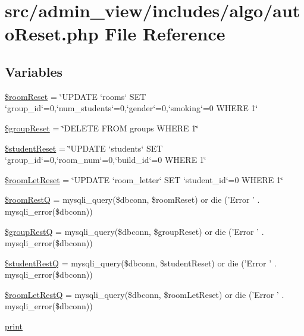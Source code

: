\hypertarget{autoReset_8php}{\section{src/admin\-\_\-view/includes/algo/auto\-Reset.php \-File \-Reference}
\label{autoReset_8php}
}
\subsection*{\-Variables}
\begin{DoxyCompactItemize}
\item 
\hyperlink{autoReset_8php_aacb611dbf5c84e030f2c54eff45ca222}{\$room\-Reset} = \char`\"{}\-U\-P\-D\-A\-T\-E `rooms` \-S\-E\-T `group\-\_\-id`=0,`num\-\_\-students`=0,`gender`=0,`smoking`=0 \-W\-H\-E\-R\-E 1\char`\"{}
\item 
\hyperlink{autoReset_8php_a196911b75d870334239968cfe0faccea}{\$group\-Reset} = \char`\"{}\-D\-E\-L\-E\-T\-E \-F\-R\-O\-M groups \-W\-H\-E\-R\-E 1\char`\"{}
\item 
\hyperlink{autoReset_8php_a9b9cdc0f04cb545881acb36c15d42c5e}{\$student\-Reset} = \char`\"{}\-U\-P\-D\-A\-T\-E `students` \-S\-E\-T `group\-\_\-id`=0,`room\-\_\-num`=0,`build\-\_\-id`=0 \-W\-H\-E\-R\-E 1\char`\"{}
\item 
\hyperlink{autoReset_8php_abdc52362179d3c8ff144e8da3468d399}{\$room\-Let\-Reset} = \char`\"{}\-U\-P\-D\-A\-T\-E `room\-\_\-letter` \-S\-E\-T `student\-\_\-id`=0 \-W\-H\-E\-R\-E 1\char`\"{}
\item 
\hyperlink{autoReset_8php_a5ee9920a3f7aaf091b8092eefdb65239}{\$room\-Rest\-Q} = mysqli\-\_\-query(\$dbconn, \$room\-Reset) or die ('\-Error ' . mysqli\-\_\-error(\$dbconn))
\item 
\hyperlink{autoReset_8php_a569059e4fb7abd35a8b0573e74b8c8cf}{\$group\-Rest\-Q} = mysqli\-\_\-query(\$dbconn, \$group\-Reset) or die ('\-Error ' . mysqli\-\_\-error(\$dbconn))
\item 
\hyperlink{autoReset_8php_ad531504cb204dbfaa4c9f041dba740e6}{\$student\-Rest\-Q} = mysqli\-\_\-query(\$dbconn, \$student\-Reset) or die ('\-Error ' . mysqli\-\_\-error(\$dbconn))
\item 
\hyperlink{autoReset_8php_a97de145c656e04df0e5900451d77e099}{\$room\-Let\-Rest\-Q} = mysqli\-\_\-query(\$dbconn, \$room\-Let\-Reset) or die ('\-Error ' . mysqli\-\_\-error(\$dbconn))
\item 
\hyperlink{autoReset_8php_a3ad3a4240c0f97c7e85aff5c52a454d4}{print}
\end{DoxyCompactItemize}


